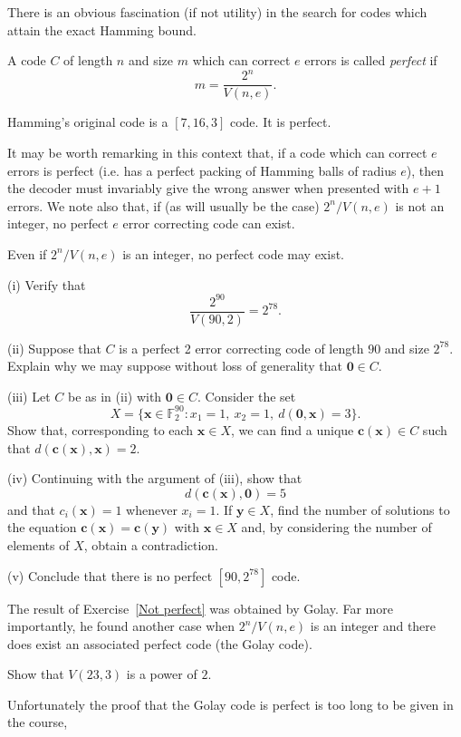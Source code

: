 There is an obvious fascination (if not utility)
in the search for codes which attain the
exact Hamming bound.
\begin{definition} A code $C$ of length $n$
and size $m$ which can correct $e$ errors
is called \emph{perfect} if
\[m=\frac{2^{n}}{V(n,e)}.\]
\end{definition}
\begin{lemma} Hamming's original code is
a $[7,16,3]$ code. It is perfect.
\end{lemma}
It may be worth remarking in this context
that, if a code which can correct $e$ errors
is perfect (i.e. has a perfect packing
of Hamming balls of radius $e$),
then the decoder must invariably
give the wrong answer when presented with
$e+1$ errors. We note also that,
if (as will usually be the case)
$2^{n}/V(n,e)$ is not an integer, no
perfect $e$ error correcting code can exist.


\begin{exercise}\label{Not perfect}
Even if $2^{n}/V(n,e)$ is an integer,
no perfect code may exist.

(i) Verify that
\[\frac{2^{90}}{V(90,2)}=2^{78}.\]

(ii) Suppose that $C$ is a perfect 2 error correcting
code of length $90$ and size $2^{78}$. Explain
why we may suppose without loss of generality
that ${\boldsymbol 0}\in C$.

(iii) Let $C$ be as in (ii) with ${\boldsymbol 0}\in C$.
Consider the set
\[X=\{{\mathbf x}\in{\mathbb F}_{2}^{90}:
x_{1}=1,\ x_{2}=1,\ d({\boldsymbol 0},{\mathbf x})=3\}.\]
Show that, corresponding to each ${\mathbf x}\in X$,
we can find a unique ${\mathbf c}({\mathbf x})\in C$
such that $d({\mathbf c}({\mathbf x}),{\mathbf x})=2$.

(iv) Continuing with the argument of (iii), show
that
\[d({\mathbf c}({\mathbf x}),{\boldsymbol 0})=5\]
and that $c_{i}({\mathbf x})=1$ whenever $x_{i}=1$.
If  $\mathbf{y}\in X$,
find the number of solutions to the equation
${\mathbf c}({\mathbf x})={\mathbf c}({\mathbf y})$
with $\mathbf{x}\in X$
and, by considering the number of elements of $X$,
obtain a contradiction.

(v) Conclude that there is no perfect $[90,2^{78}]$ code.
\end{exercise}
The  result of Exercise~\ref{Not perfect} was obtained by
Golay. Far more importantly, he found another case
when $2^{n}/V(n,e)$ is an integer and there
does exist an associated perfect code (the Golay code).
\begin{exercise}\label{Golay perfect}
Show that $V(23,3)$ is a power of $2$.
\end{exercise}
Unfortunately the proof that the Golay code is perfect is
too long to be given in the course,



